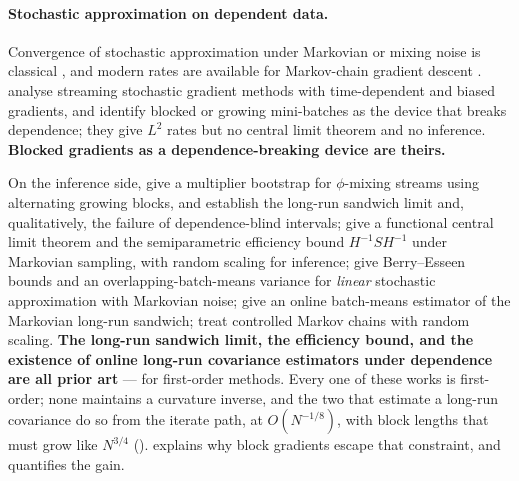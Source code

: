 \paragraph{Stochastic approximation on dependent data.}
Convergence of stochastic approximation under Markovian or mixing noise is classical
\citep{benveniste1990adaptive,kushner2003stochastic,borkar2008stochastic,andrieu2005stability,fort2015central,karimi2019nonasymptotic},
and modern rates are available for Markov-chain gradient descent
\citep{sun2018markov,doan2020convergence,even2023stochastic,duchi2012ergodic,nagaraj2020least,kowshik2021streaming,agarwal2013generalization}.
\citet{godichonbaggioni2023learning} analyse streaming stochastic gradient methods with
time-dependent and biased gradients, and identify blocked or growing mini-batches as the
device that breaks dependence; they give $L^2$ rates but no central limit theorem and no
inference. \textbf{Blocked gradients as a dependence-breaking device are theirs.}

On the inference side, \citet{liu2023mixing} give a multiplier bootstrap for
$\phi$-mixing streams using alternating growing blocks, and establish the long-run
sandwich limit and, qualitatively, the failure of dependence-blind intervals;
\citet{li2023markovian} give a functional central limit theorem and the semiparametric
efficiency bound $H^{-1}SH^{-1}$ under Markovian sampling, with random scaling for
inference; \citet{samsonov2025statistical} give Berry--Esseen bounds and an
overlapping-batch-means variance for \emph{linear} stochastic approximation with Markovian
noise; \citet{roy2023online} give an online batch-means estimator of the Markovian
long-run sandwich; \citet{li2026stream} treat controlled Markov chains with random scaling.
\textbf{The long-run sandwich limit, the efficiency bound, and the existence of online
long-run covariance estimators under dependence are all prior art} --- for first-order
methods. Every one of these works is first-order; none maintains a curvature inverse, and
the two that estimate a long-run covariance do so from the iterate path, at
$O(N^{-1/8})$, with block lengths that must grow like $N^{3/4}$
(\citealp[Prop.~2, Cor.~2]{samsonov2025statistical}).  explains why
block gradients escape that constraint, and  quantifies the gain.


